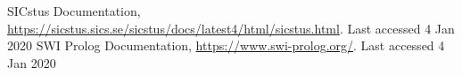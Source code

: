 \documentclass[runningheads]{llncs}
\begin{document}
%
%
% 
% 
%
\begin{thebibliography}{8}
SICstus Documentation, \url{https://sicstus.sics.se/sicstus/docs/latest4/html/sicstus.html}. Last accessed 4
Jan 2020
SWI Prolog Documentation, \url{https://www.swi-prolog.org/}. Last accessed 4
Jan 2020
\end{thebibliography}
\end{document}
